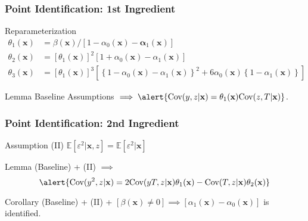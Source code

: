 \documentclass[handout]{beamer}
\begin{document}
\begin{frame}
  \frametitle{Point Identification: 1st Ingredient}



  \begin{block}{Reparameterization}
    \vspace{-1em}
\begin{align*}
  \theta_1(\mathbf{x}) &= \beta(\mathbf{x})/\left[ 1 - \alpha_0(\mathbf{x}) - \mathbf{\alpha}_1(\mathbf{x})  \right]\\
  \theta_2(\mathbf{x}) &= \left[\theta_1(\mathbf{x})\right]^2 \left[ 1 + \alpha_0(\mathbf{x}) - \alpha_1(\mathbf{x})\right] \\
  \theta_3(\mathbf{x}) &= \left[\theta_1(\mathbf{x})\right]^3\left[ \left\{ 1 - \alpha_0(\mathbf{x}) - \alpha_1(\mathbf{x}) \right\}^2 + 6\alpha_0(\mathbf{x})\left\{ 1 - \alpha_1(\mathbf{x}) \right\} \right]
\end{align*}
  \end{block}


  \begin{block}{Lemma}
    Baseline Assumptions $\implies \alert{\mbox{Cov}(y,z|\mathbf{x}) = \theta_1(\mathbf{x}) \mbox{Cov}(z,T|\mathbf{x})}$.
  \end{block}


\end{frame}
\begin{frame}
  \frametitle{Point Identification: 2nd Ingredient}

  \begin{block}{Assumption (II)}
    $\mathbb{E}[\varepsilon^2|\mathbf{x},z] = \mathbb{E}[\varepsilon^2|\mathbf{x}]$
  \end{block}

  \vspace{0.5em}

  \begin{block}{Lemma}
    (Baseline) + (II) $\implies$ 
    \[
      \alert{\mbox{Cov}(y^2,z|\mathbf{x}) = 2\mbox{Cov}(yT,z|\mathbf{x}) \theta_1(\mathbf{x}) -\mbox{Cov}(T,z|\mathbf{x})\theta_2(\mathbf{x})}
    \]
  \end{block}

  \vspace{0.5em}

  \begin{block}{Corollary}
    (Baseline) + (II) + $[\beta(\mathbf{x})\neq 0] \implies \left[ \alpha_1(\mathbf{x}) - \alpha_0(\mathbf{x}) \right]$ is identified. 
  \end{block}
    


  
\end{frame}
\end{document}
